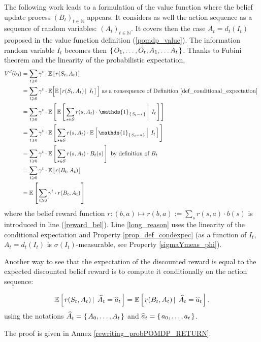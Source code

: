 The following work leads to a formulation of the value function
where the belief update process $(B_t)_{t \in \mathbb{N}}$ appears.
It considers as well the action sequence 
as a sequence of random variables: $(A_t)_{t \in \mathbb{N}}$.
It covers then the case $A_t=d_t(I_t)$ proposed in the 
value function definition (\ref{pomdp_value}).
The information random variable $I_t$
becomes then 
$\left\{ \left.  O_1, \ldots, O_t, A_1, \ldots A_t  \right. \right\}$.
Thanks to Fubini theorem and the linearity of the probabilistic expectation,
\begin{align}
\nonumber V^d(b_0)  	& = \sum_{ t \geqslant 0} \gamma^t \cdot \mathbb{E} \croch{ r(S_t,A_t) }  \\
\nonumber			& = \sum_{ t \geqslant 0} \gamma^t \cdot \mathbb{E} \Big[ \mathbb{E} \croch{r(S_t,A_t) \sachant I_t } \Big]
\mbox{ as a consequence of Definition \ref{def_conditional_expectation} }  \\
\nonumber	& = \sum_{ t \geqslant 0} \gamma^t \cdot \mathbb{E} \croch{ \mathbb{E} \croch{ \sum_{s \in \mathcal{S}} r(s,A_t) \cdot \mathds{1}_{\set{S_t = s}} \sachant I_t } } \\
\label{long_reason}	& = \sum_{ t \geqslant 0} \gamma^t \cdot \mathbb{E} \croch{  \sum_{s \in \mathcal{S}} r(s,A_t) \cdot \mathbb{E} \croch{ \mathds{1}_{\set{S_t = s}} \sachant I_t } } \\
\nonumber	& = \sum_{ t \geqslant 0} \gamma^t \cdot \mathbb{E} \croch{ \sum_{s \in \mathcal{S}} r(s,A_t) \cdot B_t(s) }
\mbox{ by definition of } B_t \\
\label{reward_bel}	& = \sum_{ t \geqslant 0} \gamma^t \cdot \mathbb{E} \croch{ r(B_t,A_t) } \\ 
\nonumber		& = \mathbb{E} \croch{ \sum_{ t \geqslant 0} \gamma^t \cdot  r(B_t,A_t) }
\end{align}
where the belief reward function $r: (b,a) \mapsto r(b,a):= \sum_s r(s,a) \cdot b(s)$ 
is introduced in line (\ref{reward_bel}).
Line \ref{long_reason} uses the linearity of the conditional expectation 
and Property \ref{prop_def_condexpec} (as a function of $I_t$, $A_t = d_t(I_t)$ is $\sigma(I_t)$-measurable, see Property \ref{sigmaYmeas_phi}).

Another way to see that the expectation of the discounted reward is equal to the expected discounted belief reward 
is to compute it conditionally on the action sequence:
\begin{theorem}
\label{rewriting_probPOMDP}
\begin{equation}
\mathbb{E} \left[ \left.  r(S_t,A_t) \, \right| \left. \, \widehat{A}_{t} = \widehat{a}_{t}  \right. \right] = \mathbb{E} \left[ \left.  r(B_t,A_t) \, \right| \left. \, \widehat{A}_{t} = \widehat{a}_{t}  \right. \right].
\label{reward_cond}
\end{equation}
using the notations 
$\widehat{A}_{t} = \left\{ \left.  A_0, \ldots, A_{t}  \right. \right\}$
and
$\widehat{a}_{t} = \left\{ \left.  a_0, \ldots, a_{t}  \right. \right\}$.
\end{theorem}
The proof is given in Annex \ref{rewriting_probPOMDP_RETURN}.

